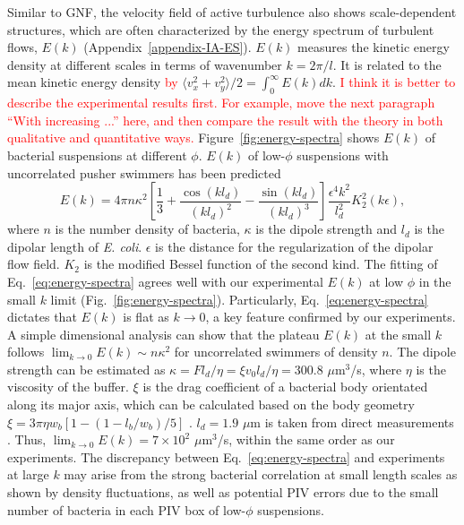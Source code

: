 \documentclass[twocolumn,aps,prx,amsmath,amssymb,longbibliography,superscriptaddress]{revtex4-2}
\begin{document}
Similar to GNF, the velocity field of active turbulence also shows scale-dependent structures, which are often characterized by the energy spectrum of turbulent flows, $E(k)$ (Appendix~\ref{appendix-IA-ES}). $E(k)$ measures the kinetic energy density at different scales in terms of wavenumber $k = 2\pi/l$. It is related to the mean kinetic energy density \textcolor{red}{by} $\langle v_x^2 + v_y^2 \rangle/2 = \int_0^\infty E(k)dk$. \textcolor{red}{I think it is better to describe the experimental results first. For example, move the next paragraph ``With increasing ...'' here, and then compare the result with the theory in both qualitative and quantitative ways.} Figure~\ref{fig:energy-spectra} shows $E(k)$ of bacterial suspensions at different $\phi$. $E(k)$ of low-$\phi$ suspensions with uncorrelated pusher swimmers has been predicted \cite{Bardfalvy2019}
\begin{equation}
\label{eq:energy-spectra}
E(k) = 4\pi n \kappa^2 \left[ \frac{1}{3} + \frac{\cos(kl_d)}{(kl_d)^2} - \frac{\sin(kl_d)}{(kl_d)^3} \right] \frac{\epsilon^4k^2}{l_d^2} K_2^2(k\epsilon),
\end{equation}
where $n$ is the number density of bacteria, $\kappa$ is the dipole strength and $l_d$ is the dipolar length of \textit{E. coli}. $\epsilon$ is the distance for the regularization of the dipolar flow field. $K_2$ is the modified Bessel function of the second kind.
The fitting of Eq.~\ref{eq:energy-spectra} agrees well with our experimental $E(k)$ at low $\phi$ in the small $k$ limit (Fig.~\ref{fig:energy-spectra}). Particularly, Eq.~\ref{eq:energy-spectra} dictates that $E(k)$ is flat as $k \to 0$, a key feature confirmed by our experiments. A simple dimensional analysis can show that the plateau $E(k)$ at the small $k$ follows $\lim_{k \to 0}E(k) \sim n \kappa^2$ for uncorrelated swimmers of density $n$. The dipole strength can be estimated as $\kappa = Fl_d/\eta = \xi v_0 l_d/\eta = 300.8$ $\mu$m$^3$/s, where $\eta$ is the viscosity of the buffer. $\xi$ is the drag coefficient of a bacterial body orientated along its major axis, which can be calculated based on the body geometry $\xi = 3\pi\eta w_b \left[1-(1-l_b/w_b)/5\right]$ \cite{Magariyama2002}. $l_d = 1.9$ $\mu$m is taken from direct measurements \cite{Drescher2011}. Thus, $\lim_{k \to 0}E(k) = 7 \times 10^2$ $\mu$m$^3$/s, within the same order as our experiments. The discrepancy between Eq.~\ref{eq:energy-spectra} and experiments at large $k$ may arise from the strong bacterial correlation at small length scales as shown by density fluctuations, as well as potential PIV errors due to the small number of bacteria in each PIV box of low-$\phi$ suspensions.
\end{document}
